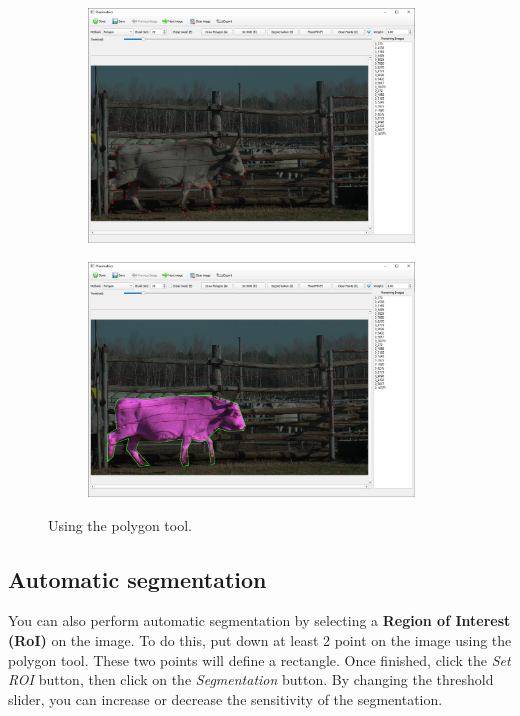 \documentclass[10pt,a4paper,oneside]{report}             %
\begin{document}
\begin{figure}[H]
	\centering
	\begin{subfigure}{\textwidth}
		\centering 
		\includegraphics[width=0.95\textwidth]{./images/PlaniPoly1.png}
	\end{subfigure}
	\begin{subfigure}{\textwidth}
	\centering 
	\includegraphics[width=0.95\textwidth]{./images/PlaniPoly2.png}
	\end{subfigure}
	\caption[]
	{\small  Using the polygon tool.}
\end{figure} 

\subsection{Automatic segmentation}

You can also perform automatic segmentation by selecting a \textbf{Region of Interest (RoI)} on the image. To do this, put down at least 2 point on the image using the polygon tool. These two points will define a rectangle. Once finished, click the \textit{Set ROI} button, then click on the \textit{Segmentation} button. By changing the threshold slider, you can increase or decrease the sensitivity of the segmentation.
\end{document}

